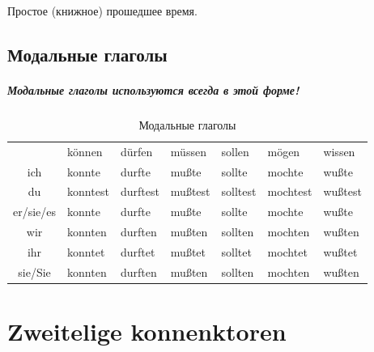 \documentclass[12pt,a4paper]{report}
\begin{document}
Простое (книжное) прошедшее время.

\section{Модальные глаголы}

\paragraph{Модальные глаголы используются всегда в этой форме!}

\begin{longtable}{ c l l l l l l }
\caption{Модальные глаголы} \label{tab:long} \\
				& können 	& dürfen 	& müssen 	& sollen 	& mögen 	& wissen 	\\

	ich 		& konnte 	& durfte 	& mußte 	& sollte 	& mochte 	& wußte 	\\
	du 			& konntest 	& durftest	& mußtest	& solltest	& mochtest	& wußtest 	\\
	er/sie/es 	& konnte 	& durfte 	& mußte		& sollte	& mochte	& wußte		\\
	wir 		& konnten 	& durften 	& mußten	& sollten	& mochten	& wußten	\\
	ihr			& konntet 	& durftet 	& mußtet	& solltet	& mochtet	& wußtet	\\
	sie/Sie		& konnten 	& durften 	& mußten	& sollten	& mochten	& wußten	\\

\end{longtable}

\chapter{Zweitelige konnenktoren}
\end{document}
